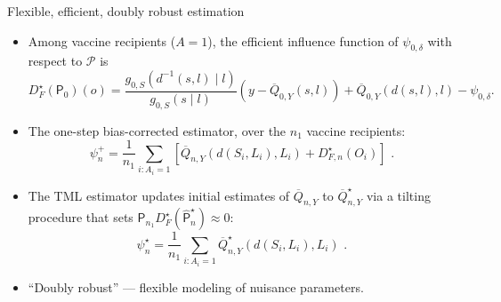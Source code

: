 \documentclass{beamer}
\begin{document}
\begin{frame}[c]{Flexible, efficient, doubly robust estimation}

\begin{center}
\begin{itemize}
  \itemsep8pt
  \item Among vaccine recipients ($A = 1$), the efficient influence function
    of $\psi_{0, \delta}$ with respect to $\mathcal{P}$ is
    \begin{equation*}
      D^{\star}_{F}(\mathsf{P}_0)(o) = \frac{g_{0,S}(d^{-1}(s,l) \mid l)}
      {g_{0,S}(s \mid l)} ({y - \overline{Q}_{0,Y}(s,l)}) +
      \overline{Q}_{0,Y}(d(s,l), l) - \psi_{0,\delta}.
    \end{equation*}
  \item The one-step bias-corrected estimator, over the $n_1$ vaccine
    recipients:
    \begin{equation*}\label{tmle}
        \psi_n^{+} = \frac{1}{n_1} \sum_{i : A_i = 1} \left[\overline{Q}_{n,Y}(d(S_i,
        L_i), L_i) + D^{\star}_{F,n}(O_i)\right] \,\, .
      \end{equation*}
  \item The TML estimator updates initial estimates of $\overline{Q}_{n,Y}$ to
    $\overline{Q}_{n,Y}^{\star}$ via a tilting procedure that sets
    $\mathsf{P}_{n_1} D^{\star}_{F}(\hat{\mathsf{P}}_n^{\star}) \approx 0$:
    \begin{equation*}\label{tmle}
      \psi_n^{\star} = \frac{1}{n_1} \sum_{i : A_i = 1}
      \overline{Q}_{n,Y}^{\star}(d(S_i, L_i), L_i) \,\, .
      \end{equation*}
  \item ``Doubly robust'' --- flexible modeling of nuisance parameters.
\end{itemize}
\end{center}


\end{frame}
\end{document}
